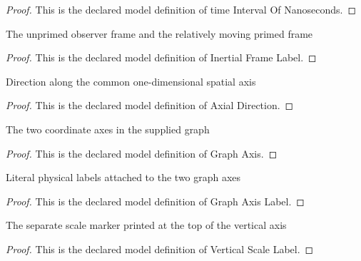 \begin{proof}
  This is the declared model definition of time Interval Of Nanoseconds.
\end{proof}
\begin{definition}
  \label{def:physics:phyx-mini-0592:phyxminiproblems-problemphyxmini0592-inertialframelabel}
  The unprimed observer frame and the relatively moving primed frame
\end{definition}
\begin{proof}
  This is the declared model definition of Inertial Frame Label.
\end{proof}
\begin{definition}
  \label{def:physics:phyx-mini-0592:phyxminiproblems-problemphyxmini0592-axialdirection}
  Direction along the common one-dimensional spatial axis
\end{definition}
\begin{proof}
  This is the declared model definition of Axial Direction.
\end{proof}
\begin{definition}
  \label{def:physics:phyx-mini-0592:phyxminiproblems-problemphyxmini0592-graphaxis}
  The two coordinate axes in the supplied graph
\end{definition}
\begin{proof}
  This is the declared model definition of Graph Axis.
\end{proof}
\begin{definition}
  \label{def:physics:phyx-mini-0592:phyxminiproblems-problemphyxmini0592-graphaxislabel}
  Literal physical labels attached to the two graph axes
\end{definition}
\begin{proof}
  This is the declared model definition of Graph Axis Label.
\end{proof}
\begin{definition}
  \label{def:physics:phyx-mini-0592:phyxminiproblems-problemphyxmini0592-verticalscalelabel}
  The separate scale marker printed at the top of the vertical axis
\end{definition}
\begin{proof}
  This is the declared model definition of Vertical Scale Label.
\end{proof}
